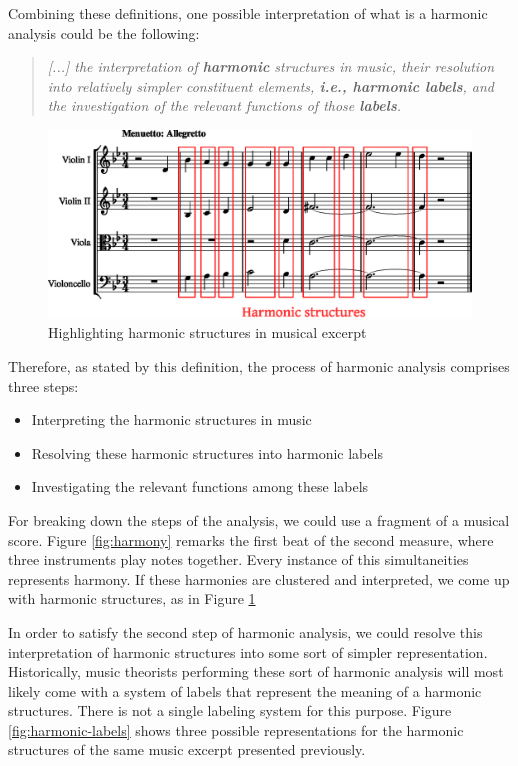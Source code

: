 Combining these definitions, one possible interpretation of what is a harmonic analysis could be the following:

\begin{quote}
\centering
\emph{[...] the interpretation of \textbf{harmonic} structures in music,
their resolution into relatively simpler constituent elements, \textbf{i.e., harmonic labels}, and the investigation of the relevant functions of those \textbf{labels}.}
\end{quote}

\begin{figure}[h]
  \caption{Highlighting harmonic structures in musical excerpt}
  \label{fig:harmonic-structures}
  \centering
    \includegraphics[width=1.0\textwidth]{01-introduction/figures/2}
\end{figure}

Therefore, as stated by this definition, the process of harmonic analysis comprises three steps:

\begin{itemize}
  \item Interpreting the harmonic structures in music
  \item Resolving these harmonic structures into harmonic labels
  \item Investigating the relevant functions among these labels
\end{itemize}

For breaking down the steps of the analysis, we could use a fragment of a musical score. Figure \ref{fig:harmony} remarks the first beat of the second measure, where three instruments play notes together. Every instance of this simultaneities represents harmony. If these harmonies are clustered and interpreted, we come up with harmonic structures, as in Figure \ref{fig:harmonic-structures}

In order to satisfy the second step of harmonic analysis, we could resolve this interpretation of harmonic structures into some sort of simpler representation. Historically, music theorists performing these sort of harmonic analysis will most likely come with a system of labels that represent the meaning of a harmonic structures. There is not a single labeling system for this purpose. Figure \ref{fig:harmonic-labels} shows three possible representations for the harmonic structures of the same music excerpt presented previously.


